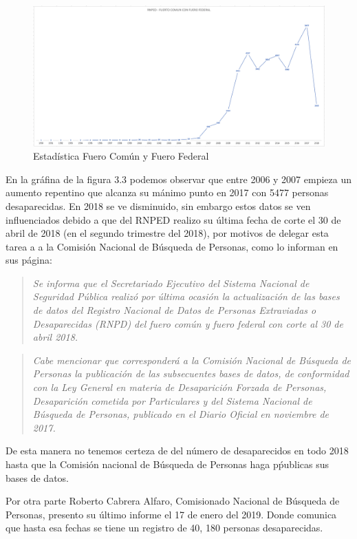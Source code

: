 \begin{figure}[bp!]
	\centering
	\includegraphics[width=5in]{imgs/fuerocomunYfuerofederal}
	  \caption{Estad\'istica Fuero Común y Fuero Federal}
\end{figure}

En la gr\'afina de la figura 3.3 podemos observar que entre 2006 y 2007 empieza un aumento repentino que alcanza su m\'animo punto en 2017 con 5477 personas desaparecidas. En 2018 se ve disminuido, sin embargo estos datos se ven influenciados debido a que del RNPED realizo su última fecha de corte el 30 de abril de 2018 (en el segundo trimestre del 2018), por motivos de delegar esta tarea a a la Comisión Nacional de Búsqueda de Personas, como lo informan en sus p\'agina:

\begin{quote}
\textit{Se informa que el Secretariado Ejecutivo del Sistema Nacional de Seguridad Pública realizó por última ocasión la actualización de las bases de datos del Registro Nacional de Datos de Personas Extraviadas o Desaparecidas (RNPD) del fuero común y fuero federal con corte al 30 de abril 2018.}
\end{quote}

\begin{quote}
\textit{
Cabe mencionar que corresponderá a la Comisión Nacional de Búsqueda de Personas la publicación de las subsecuentes bases de datos, de conformidad con la Ley General en materia de Desaparición Forzada de Personas, Desaparición cometida por Particulares y del Sistema Nacional de Búsqueda de Personas, publicado en el Diario Oficial en noviembre de 2017.}
\end{quote}


De esta manera no tenemos certeza de del número de desaparecidos en todo 2018 hasta que la Comisi\'on nacional de B\'usqueda de Personas haga p\'publicas sus bases de datos.

Por otra parte Roberto Cabrera Alfaro, Comisionado Nacional de B\'usqueda de Personas, presento su último informe el 17 de enero del 2019. Donde comunica que hasta esa fechas se tiene un registro de 40, 180 personas desaparecidas.

